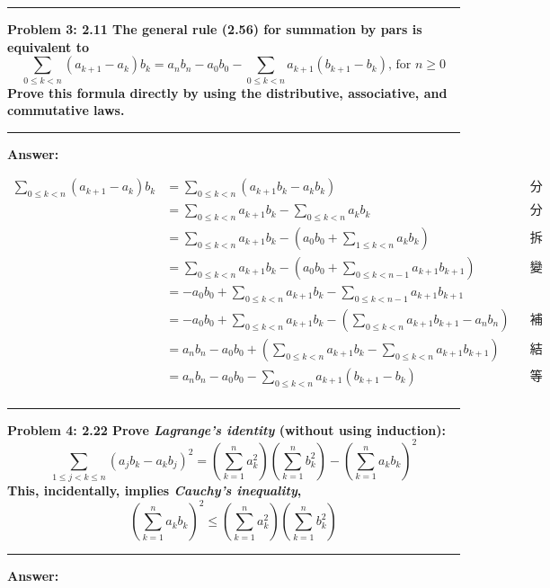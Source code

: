 \documentclass[11pt]{article}
\newcommand\question[2]{\vspace{.25in}\hrule\textbf{#1: #2}\vspace{.5em}\hrule\vspace{.10in}}
\renewcommand\part[1]{\vspace{.10in}\textbf{#1}}
\begin{document}

\question{Problem 3}{2.11 The general rule (2.56) for summation by pars is equivalent to
		$$
		\sum_{0 \le k < n} (a_{k+1} - a_k) b_k = a_n b_n - a_0 b_0 
												- \sum_{0 \le k < n} a_{k+1} (b_{k+1} - b_k)\text{, for } n \ge 0
		$$
		Prove this formula directly by using the distributive, associative, and commutative laws.
}

\part{Answer:} 

\begin{align*}
	\sum_{0 \le k < n} (a_{k+1} - a_k) b_k &= \sum_{0 \le k < n} (a_{k+1} b_k - a_k b_k) 
					&& \text{分配律} \\
			&= \sum_{0 \le k < n} a_{k+1} b_k - \sum_{0 \le k < n} a_k b_k 
					&& \text{分配律} \\
			&= \sum_{0 \le k < n} a_{k+1} b_k - (a_0 b_0 + \sum_{1 \le k < n} a_k b_k) 
					&& \text{拆首項} \\
			&= \sum_{0 \le k < n} a_{k+1} b_k - (a_0 b_0 + \sum_{0 \le k < n-1} a_{k+1} b_{k+1}) 
					&& \text{變量修改} \\
			&= - a_0 b_0 + \sum_{0 \le k < n} a_{k+1} b_k - \sum_{0 \le k < n-1} a_{k+1} b_{k+1} 
					&& \text{} \\
			&= - a_0 b_0 + \sum_{0 \le k < n} a_{k+1} b_k - (\sum_{0 \le k < n} a_{k+1} b_{k+1} - a_n b_n) 
					&& \text{補項調整} \\
			&= a_n b_n - a_0 b_0 + \left ( \sum_{0 \le k < n} a_{k+1} b_k - \sum_{0 \le k < n} a_{k+1} b_{k+1} \right ) 
					&& \text{結合律} \\
			&= a_n b_n - a_0 b_0 - \sum_{0 \le k < n} a_{k+1} (b_{k+1} - b_k)
					&& \text{等價得證} \\
\end{align*}

\question{Problem 4}{2.22 Prove \textit{Lagrange's identity} (without using induction):
	$$
		\sum_{1 \le j < k \le n} (a_j b_k - a_k b_j)^2 = 
			\left ( \sum_{k=1}^{n} a_k^2 \right )
			\left ( \sum_{k=1}^{n} b_k^2 \right )
		- \left ( \sum_{k=1}^{n} a_k b_k \right )^2
	$$
	This, incidentally, implies \textit{Cauchy's inequality},
	$$
		\left ( \sum_{k = 1}^{n} a_k b_k \right )^2 \le
			\left ( \sum_{k=1}^{n} a_k^2 \right )
			\left ( \sum_{k=1}^{n} b_k^2 \right )
	$$
}

\part{Answer:} 
\end{document}

